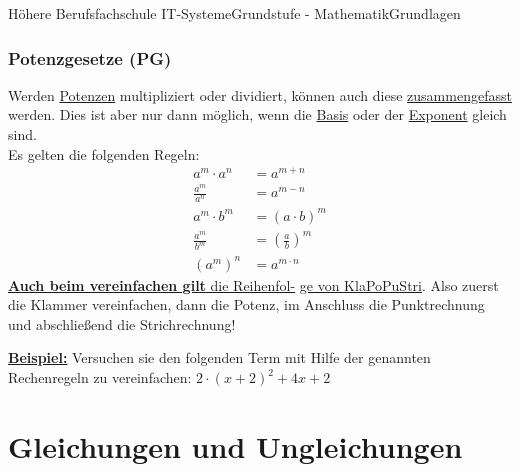 \documentclass[11pt,twocolumn,oneside,openany,headings=optiontotoc,11pt,numbers=noenddot]{article}
\begin{document}
\begin{worksheet}{Höhere Berufsfachschule IT-Systeme}{Grundstufe - Mathematik}{Grundlagen}
		\subsubsection*{Potenzgesetze (PG)}
		Werden \underline{Potenzen} multipliziert oder dividiert, können auch diese \underline{zusammengefasst} werden. Dies ist aber nur dann möglich, wenn die \underline{Basis} oder der \underline{Exponent} gleich sind.\\
		Es gelten die folgenden Regeln:
		\begin{align*}
			a^m\cdot{}a^n & = a ^{m+n}\\
			\frac{a^m}{a^n} & = a^{m-n}\\
			a^m\cdot{}b^m & = (a\cdot{}b)^m\\
			\frac{a^m}{b^m} & = \left(\frac{a}{b}\right)^m\\
			(a^m)^n & = a^{m\cdot{}n}
		\end{align*}
		\newpage
		\underline{\textbf{Auch beim vereinfachen gilt} die Reihenfol-} \underline{ge von \color{red}KlaPoPuStri\normalcolor}. Also zuerst die Klammer vereinfachen, dann die Potenz, im Anschluss die Punktrechnung und abschließend die Strichrechnung!\\
		\par\bigskip\noindent
		\underline{\textbf{Beispiel:}} Versuchen sie den folgenden Term mit Hilfe der genannten Rechenregeln zu vereinfachen: \(2\cdot{}(x+2)^2 + 4x + 2\)
		\newpage
		\section{Gleichungen und Ungleichungen}

\end{worksheet}
\end{document}

